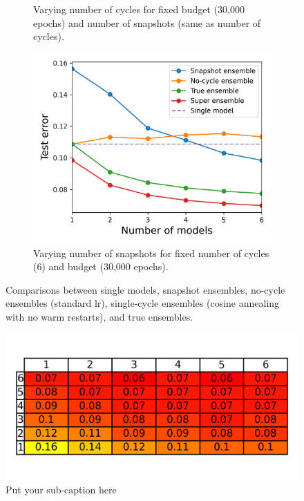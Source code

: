 \begin{figure}[]
\begin{subfigure}{.45\textwidth}
		\caption{Varying number of cycles for fixed budget (30,000 epochs) and number of snapshots (same as number of cycles).}
		\label{fig:sub-second}
	\end{subfigure}
	\begin{subfigure}{.45\textwidth}
		\centering
		\includegraphics[width=1\linewidth]{./figs/vary_snaps.png}  
		\caption{Varying number of snapshots for fixed number of cycles (6) and budget (30,000 epochs).}
		\label{fig:sub-second}
	\end{subfigure}
	\caption{Comparisons between single models, snapshot ensembles, no-cycle ensembles (standard lr), single-cycle ensembles (cosine annealing with no warm restarts), and true ensembles.}
	\label{fig:fig}
\end{figure}

\blindtext

\begin{figure}
	\centering
	\includegraphics[width=0.6\linewidth]{./figs/kmn_plot.png}  
	\caption{Put your sub-caption here}
	\label{fig:sub-first}
\end{figure}

\blindtext

